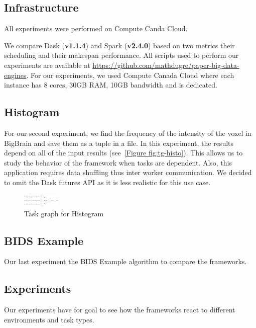 \documentclass[conference]{IEEEtran}
\begin{document}
\subsection{Infrastructure}
All experiments were performed on Compute Canda Cloud.



We compare Dask (\textbf{v1.1.4}) and Spark (\textbf{v2.4.0}) based on two metrics
their scheduling and their makespan performance. All scripts used to perform our
experiments are available at
\href{https://github.com/mathdugre/paper-big-data-engines}{https://github.com/mathdugre/paper-big-data-engines}.
For our experiments, we used Compute Canada Cloud where each instance has 8 cores,
30GB RAM, 10GB bandwidth and is dedicated.

\subsection{Histogram}
For our second experiment, we find the frequency of the intensity of the voxel in
BigBrain and save them as a tuple in a file. In this experiment, the results depend
on all of the input results (see~\ref{Figure fig:tg-histo}). This allows us to study
the behavior of the framework when tasks are dependent. Also, this application
requires data shuffling thus inter worker communication. We decided to omit the Dask
futures API as it is less realistic for this use case.

\begin{figure}[!t]
    \centering
    \includegraphics[width=0.16\textwidth, angle=-90]{images/histogram-task-graph.png}
    \caption{Task graph for Histogram}\label{fig:tg-histo}
\end{figure}

\subsection{BIDS Example}
Our last experiment the BIDS Example algorithm to compare the frameworks.


\subsection{Experiments}
Our experiments have for goal to see how the frameworks react to different
environments and task types.
\end{document}
